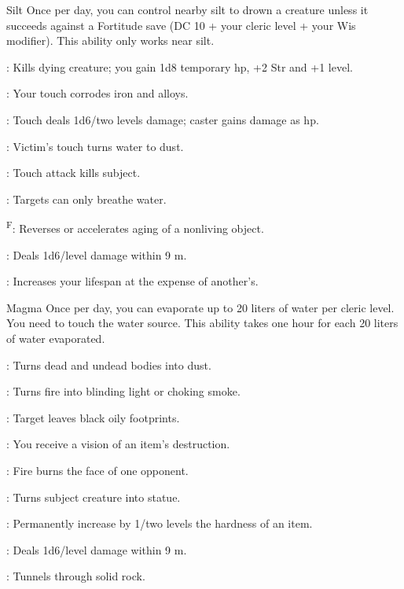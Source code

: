 {Silt}
{Once per day, you can control nearby silt to drown a creature unless it succeeds against a Fortitude save (DC 10 + \onehalf your cleric level + your Wis modifier). This ability only works near silt.}
{
	\item {}: Kills dying creature; you gain 1d8 temporary hp, +2 Str and +1 level.
	\item {}: Your touch corrodes iron and alloys.
	\item {}: Touch deals 1d6/two levels damage; caster gains damage as hp.
	\item {}: Victim's touch turns water to dust.
	\item {}: Touch attack kills subject.
	\item {}: Targets can only breathe water.
	\item {}\textsuperscript{F}: Reverses or accelerates aging of a nonliving object.
	\item {}: Deals 1d6/level damage within 9 m.
	\item {}: Increases your lifespan at the expense of another's.
}

{Magma}
{Once per day, you can evaporate up to 20 liters of water per cleric level. You need to touch the water source. This ability takes one hour for each 20 liters of water evaporated.}
{
	\item {}: Turns dead and undead bodies into dust.
	\item {}: Turns fire into blinding light or choking smoke.
	\item {}: Target leaves black oily footprints.
	\item {}: You receive a vision of an item's destruction.
	\item {}: Fire burns the face of one opponent.
	\item {}: Turns subject creature into statue.
	\item {}: Permanently increase by 1/two levels the hardness of an item.
	\item {}: Deals 1d6/level damage within 9 m.
	\item {}: Tunnels through solid rock.
}

